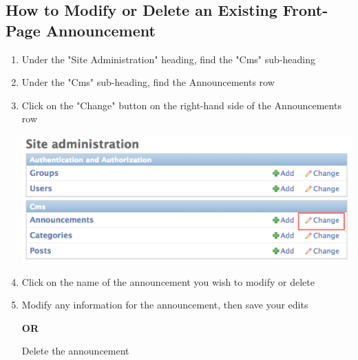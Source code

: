 \documentclass{article}
\begin{document}
\subsection*{How to Modify or Delete an Existing Front-Page Announcement}
\begin{enumerate}
	\item Under the "Site Administration" heading, find the "Cms" sub-heading
	\item Under the "Cms" sub-heading, find the Announcements row
	\item Click on the "Change" button on the right-hand side of the Announcements row
	
	\includegraphics[scale=0.45]{Announcements-picture2.png}
	
	\item Click on the name of the announcement you wish to modify or delete
	\item Modify any information for the announcement, then save your edits
	
	\textbf{OR}
	
	Delete the announcement

\end{enumerate}
\end{document}
